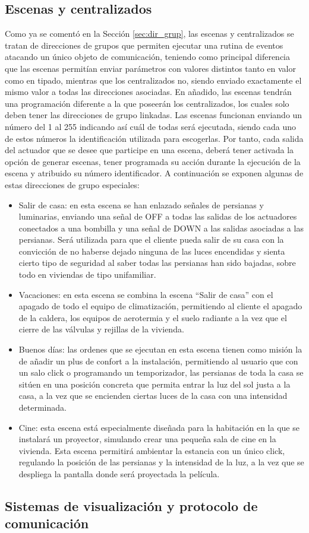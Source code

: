 \subsection{Escenas y centralizados}Como ya se comentó en la Sección \ref{sec:dir_grup}, las escenas y centralizados se tratan de direcciones de grupos que permiten ejecutar una rutina de eventos atacando un único objeto de comunicación, teniendo como principal diferencia que las escenas permitían enviar parámetros con valores distintos tanto en valor como en tipado, mientras que los centralizados no, siendo enviado exactamente el mismo valor a todas las direcciones asociadas. En añadido, las escenas tendrán una programación diferente a la que poseerán los centralizados, los cuales solo deben tener las direcciones de grupo linkadas. Las escenas funcionan enviando un número del 1 al 255 indicando así cuál de todas será ejecutada, siendo cada uno de estos números la identificación utilizada para escogerlas. Por tanto, cada salida del actuador que se desee que participe en una escena, deberá tener activada la opción de generar escenas, tener programada su acción durante la ejecución de la escena y atribuido su número identificador. A continuación se exponen algunas de estas direcciones de grupo especiales:
\begin{itemize}
\item Salir de casa: en esta escena se han enlazado señales de persianas y luminarias, enviando una señal de OFF a todas las salidas de los actuadores conectados a una bombilla y una señal de DOWN a las salidas asociadas a las persianas. Será utilizada para que el cliente pueda salir de su casa con la convicción de no haberse dejado ninguna de las luces encendidas y sienta cierto tipo de seguridad al saber todas las persianas han sido bajadas, sobre todo en viviendas de tipo unifamiliar.
\item Vacaciones: en esta escena se combina la escena “Salir de casa” con el apagado de todo el equipo de climatización, permitiendo al cliente el apagado de la caldera, los equipos de aerotermia y el suelo radiante a la vez que el cierre de las válvulas y rejillas de la vivienda.
\item Buenos días: las ordenes que se ejecutan en esta escena tienen como misión la de añadir un plus de confort a la instalación, permitiendo al usuario que con un salo click o programando un temporizador, las persianas de toda la casa se sitúen en una posición concreta que permita entrar la luz del sol justa a la casa, a la vez que se encienden ciertas luces de la casa con una intensidad determinada.
\item Cine: esta escena está especialmente diseñada para la habitación en la que se instalará un proyector, simulando crear una pequeña sala de cine en la vivienda. Esta escena permitirá ambientar la estancia con un único click, regulando la posición de las persianas y la intensidad de la luz, a la vez que se despliega la pantalla donde será proyectada la película.
\end{itemize}

\subsection{Sistemas de visualización y protocolo de comunicación}